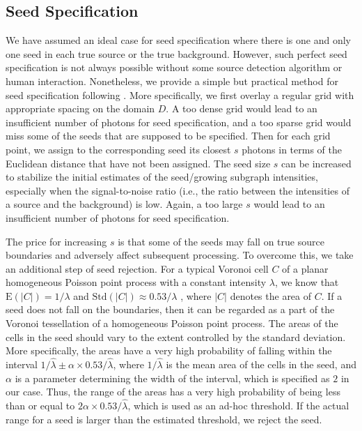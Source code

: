 \documentclass{aastex61}
\begin{document}
\subsection{Seed Specification}\label{sec:seed_spec}
We have assumed an ideal case for seed specification where there is one and only one seed in each true source or the true background. However, such perfect seed specification is not always possible without some source detection algorithm or human interaction. Nonetheless, we provide a simple but practical method for seed specification following \citet{Lee-00}. More specifically, we first overlay a regular grid with appropriate spacing on the domain $D$. A too dense grid would lead to an insufficient number of photons for seed specification, and a too sparse grid would miss some of the seeds that are supposed to be specified. Then for each grid point, we assign to the corresponding seed its closest $s$ photons in terms of the Euclidean distance that have not been assigned. The seed size $s$ can be increased to stabilize the initial estimates of the seed/growing subgraph intensities, especially when the signal-to-noise ratio (i.e., the ratio between the intensities of a source and the background) is low. Again, a too large $s$ would lead to an insufficient number of photons for seed specification.

The price for increasing $s$ is that some of the seeds may fall on true source boundaries and adversely affect subsequent processing. To overcome this, we take an additional step of seed rejection. For a typical Voronoi cell $C$ of a planar homogeneous Poisson point process with a constant intensity $\lambda$, we know that $\mbox{E}(|C|)=1/\lambda$ and $\mbox{Std}(|C|)\approx 0.53/\lambda$ \citep[Chapter 4.2]{Moller-94}, where $|C|$ denotes the area of $C$. If a seed does not fall on the boundaries, then it can be regarded as a part of the Voronoi tessellation of a homogeneous Poisson point process. The areas 
of the cells in the seed should vary to the extent controlled by the standard deviation. More specifically, the areas have a very high probability of falling within the interval $1/\hat{\lambda}\pm\alpha \times 0.53/\hat{\lambda}$, where $1/\hat{\lambda}$ is the mean area of the cells in the seed, and $\alpha$ is a parameter determining the width of the interval, which is specified as $2$ in our case.
Thus, the range of the areas has a very high probability of being less than or equal to $2\alpha \times 0.53/\hat{\lambda}$, which is used as an ad-hoc threshold. If the actual range for a seed is larger than the estimated threshold, we reject the seed.
\end{document}
